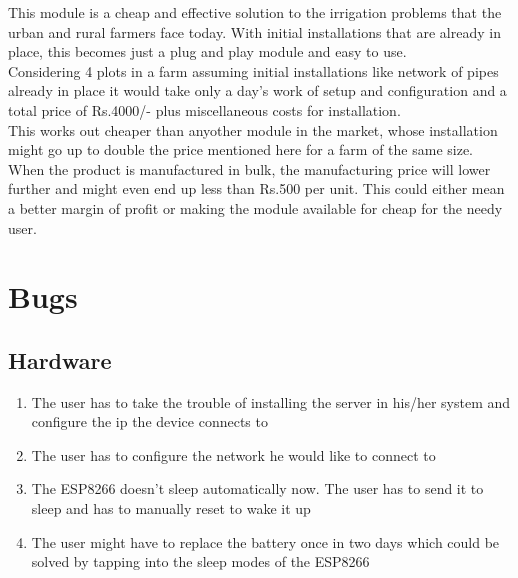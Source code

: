 \documentclass[16pt]{article}
\begin{document}
\hfill 
\vspace{1cm}

This module is a cheap and effective solution to the irrigation problems that the urban and rural farmers face today.
With initial installations that are already in place, this becomes just a plug and play module and easy to use.\\

Considering 4 plots in a farm assuming initial installations like network of pipes already in place it would take only a day's work of setup and configuration 
and a total price of Rs.4000/- plus miscellaneous costs for installation.\\

This works out cheaper than anyother module in the market, whose installation might go up to double the price mentioned here for a farm of the same size.
When the product is manufactured in bulk, the manufacturing price will lower further and might even end up less than Rs.500 per unit. This could
either mean a better margin of profit or making the module available for cheap for the needy user.  


\vspace{15cm}
\section{Bugs}

\vspace{0.5cm}

\subsection{Hardware}
\begin{enumerate}
 \item The user has to take the trouble of installing the server in his/her system and configure the ip the device connects to
 \item The user has to configure the network he would like to connect to 
 \item The ESP8266 doesn't sleep automatically now. The user has to send it to sleep and has to manually reset to wake it up
 \item The user might have to replace the battery once in two days which could be solved by tapping into the sleep modes of the ESP8266
\end{enumerate}

\vspace{0.5cm}
\end{document}
